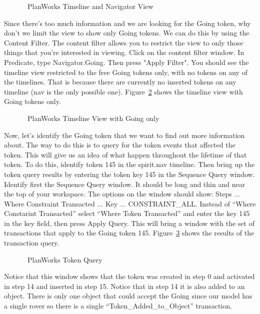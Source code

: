 \documentclass[10pt, letterpaper, twoside]{article}
\begin{document}
\begin{figure}[h]
\centering{}
\caption{\ET\, PlanWorks Timeline and Navigator View}
\label{TimelineView}
\end{figure}

Since there's too much information and we are looking for the Going token,
why don't we limit the view to show only Going tokens.  We can do this by
using the Content Filter.  The content filter allows you to restrict the
view to only those things that you're interested in viewing. Click on the
content filter window.  In Predicate, type Navigator.Going.  Then press
"Apply Filter".  You should see the timeline view restricted to the free
Going tokens only, with no tokens on any of the timelines.  That is because
there are currently no inserted tokens on any timeline (nav is the only
possible one).  Figure~\ref{TimelineViewFiltered} shows the timeline view
with Going tokens only.

\begin{figure}[h]
\centering{}
\caption{\ET\, PlanWorks Timeline View with Going only}
\label{TimelineViewFiltered}
\end{figure}

Now, let's identify the Going token that we want to find out more
information about.  The way to do this is to query for the token events
that affected the token.  This will give us an idea of what happen
throughout the lifetime of that token.  To do this, identify token 145 in
the spirit.nav timeline.  Then bring up the token query results by entering
the token key 145 in the Sequence Query window.  Identify first the Sequence
Query window.  It should be long and thin and near the top of your
workspace.  The options on the window should show: Steps ... Where
Constraint Transacted ... Key ... CONSTRAINT\_ALL. Instead of ``Where
Constarint Transacted'' select ``Where Token Transacted'' and enter the key
145 in the key field, then press Apply Query.  This will bring a window
with the set of transactions that apply to the Going token 145.
Figure~\ref{TokenQuery} shows the results of the transaction query.

\begin{figure}[htb]
\centering{}
\caption{\ET\, PlanWorks Token Query}
\label{TokenQuery}
\end{figure}

Notice that this window shows that the token was created in step 0 and
activated in step 14 and inserted in step 15.  Notice that in step 14 it is
also added to an object.  There is only one object that could accept the
Going since our model has a single rover so there is a single
``Token\_Added\_to\_Object'' transaction.
\end{document}
